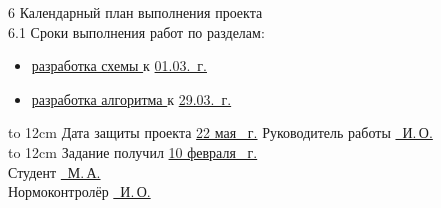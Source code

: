 6 Календарный план выполнения проекта\\
6.1 Сроки выполнения работ по разделам:
\begin{itemize}
\item \uline{разработка схемы \hfill}
  к \uline{01.03.\the\year~г. }
\item \uline{разработка алгоритма \hfill} к \uline{29.03.\the\year~г.}
\end{itemize}
\hbox to 12cm {Дата защиты проекта \uline{\hfill 22 мая \the\year~г.}}
Руководитель работы \uline{~И.\,О.}\\
\hbox to 12cm {Задание получил \uline{\hfill10 февраля \the\year~г.}}\\
Студент    \uline{~М.\,А.}\\
Нормоконтролёр    \uline{~И.\,О.}\\
\newpage
